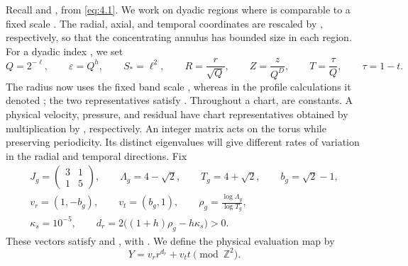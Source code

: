 Recall  and ,  from \eqref{eq:4.1}. We work on dyadic regions where  is comparable to a fixed scale . The radial, axial, and temporal coordinates are rescaled by , respectively, so that the concentrating annulus has bounded size in each region. For a dyadic index , we set
\begin{equation}
 Q=2^{-\ell},\qquad \varepsilon=Q^h,\qquad S_*=\ell^2,
 \qquad R=\frac r{\sqrt Q},\qquad Z=\frac z{Q^D},\qquad
 T=\frac\tau Q,\qquad \tau=1-t.
 \tag{6.1}\label{eq:6.1}
\end{equation}
%
The radius  now uses the fixed band scale , whereas in the profile calculations it denoted ; the two representatives satisfy . Throughout a chart,  are constants. A physical velocity, pressure, and residual have chart representatives obtained by multiplication by , respectively. An integer matrix acts on the torus while preserving periodicity. Its distinct eigenvalues will give different rates of variation in the radial and temporal directions. Fix
\begin{equation}
\begin{gathered}
 J_g=\begin{pmatrix}3&1\\1&5\end{pmatrix},\qquad
 \Lambda_g=4-\sqrt2,\qquad T_g=4+\sqrt2,\qquad b_g=\sqrt2-1,\\
 v_r=(1,-b_g),\qquad v_t=(b_g,1),\qquad
 \rho_g=\frac{\log\Lambda_g}{\log T_g},\\
 \kappa_s=10^{-5},\qquad d_r=2\bigl((1+h)\rho_g-h\kappa_s\bigr)>0.
\end{gathered}
\tag{6.2}\label{eq:6.2}
\end{equation}
These vectors satisfy  and , with . We define the physical evaluation map by
\begin{equation}
 Y=v_rr^{d_r}+v_tt\pmod{\mathbb Z^2}.
 \tag{6.3}\label{eq:6.3}
\end{equation}
